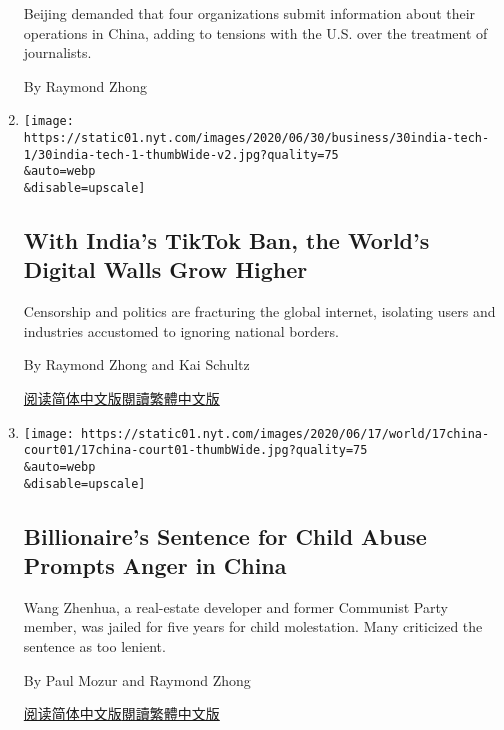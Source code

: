 \begin{enumerate}
  Beijing demanded that four organizations submit information about
  their operations in China, adding to tensions with the U.S. over the
  treatment of journalists.

  By Raymond Zhong
\item
  \href{/2020/06/30/technology/india-china-tiktok.html}{}

  \texttt{[image: https://static01.nyt.com/images/2020/06/30/business/30india-tech-1/30india-tech-1-thumbWide-v2.jpg?quality=75\\\&auto=webp\\\&disable=upscale]}

  \hypertarget{with-indias-tiktok-ban-the-worlds-digital-walls-grow-higher}{%
  \subsection{With India's TikTok Ban, the World's Digital Walls Grow
  Higher}\label{with-indias-tiktok-ban-the-worlds-digital-walls-grow-higher}}

  Censorship and politics are fracturing the global internet, isolating
  users and industries accustomed to ignoring national borders.

  By Raymond Zhong and Kai Schultz

  \href{https://cn.nytimes.com/technology/20200701/india-china-tiktok/}{阅读简体中文版}\href{https://cn.nytimes.com/technology/20200701/india-china-tiktok/zh-hant/}{閱讀繁體中文版}
\item
  \href{/2020/06/17/world/asia/china-wang-zhenhua-sentence.html}{}

  \texttt{[image: https://static01.nyt.com/images/2020/06/17/world/17china-court01/17china-court01-thumbWide.jpg?quality=75\\\&auto=webp\\\&disable=upscale]}

  \hypertarget{billionaires-sentence-for-child-abuse-prompts-anger-in-china}{%
  \subsection{Billionaire's Sentence for Child Abuse Prompts Anger in
  China}\label{billionaires-sentence-for-child-abuse-prompts-anger-in-china}}

  Wang Zhenhua, a real-estate developer and former Communist Party
  member, was jailed for five years for child molestation. Many
  criticized the sentence as too lenient.

  By Paul Mozur and Raymond Zhong

  \href{https://cn.nytimes.com/china/20200618/china-wang-zhenhua-sentence/}{阅读简体中文版}\href{https://cn.nytimes.com/china/20200618/china-wang-zhenhua-sentence/z}{閱讀繁體中文版}
\end{enumerate}

